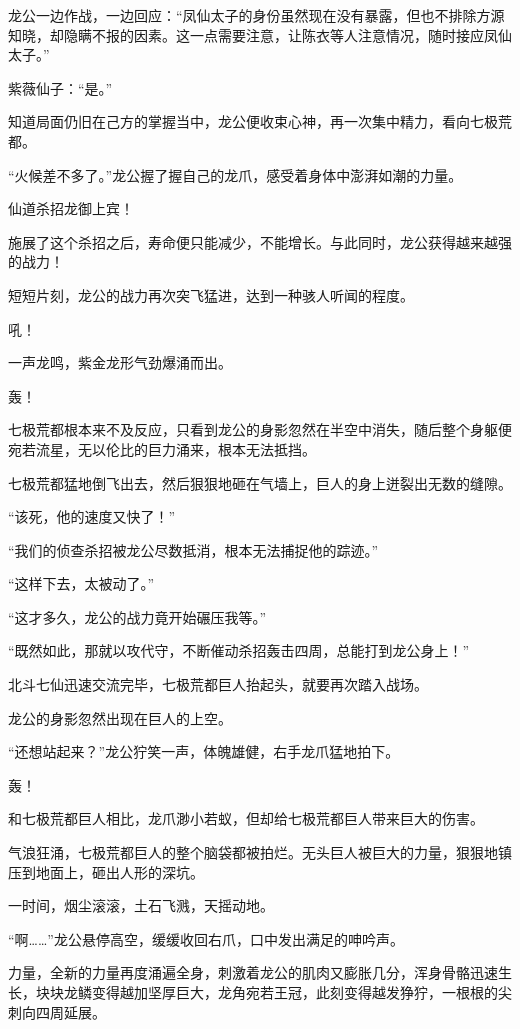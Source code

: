 \begin{this_body}
龙公一边作战，一边回应：“凤仙太子的身份虽然现在没有暴露，但也不排除方源知晓，却隐瞒不报的因素。这一点需要注意，让陈衣等人注意情况，随时接应凤仙太子。”

紫薇仙子：“是。”

知道局面仍旧在己方的掌握当中，龙公便收束心神，再一次集中精力，看向七极荒都。

“火候差不多了。”龙公握了握自己的龙爪，感受着身体中澎湃如潮的力量。

仙道杀招龙御上宾！

施展了这个杀招之后，寿命便只能减少，不能增长。与此同时，龙公获得越来越强的战力！

短短片刻，龙公的战力再次突飞猛进，达到一种骇人听闻的程度。

吼！

一声龙鸣，紫金龙形气劲爆涌而出。

轰！

七极荒都根本来不及反应，只看到龙公的身影忽然在半空中消失，随后整个身躯便宛若流星，无以伦比的巨力涌来，根本无法抵挡。

七极荒都猛地倒飞出去，然后狠狠地砸在气墙上，巨人的身上迸裂出无数的缝隙。

“该死，他的速度又快了！”

“我们的侦查杀招被龙公尽数抵消，根本无法捕捉他的踪迹。”

“这样下去，太被动了。”

“这才多久，龙公的战力竟开始碾压我等。”

“既然如此，那就以攻代守，不断催动杀招轰击四周，总能打到龙公身上！”

北斗七仙迅速交流完毕，七极荒都巨人抬起头，就要再次踏入战场。

龙公的身影忽然出现在巨人的上空。

“还想站起来？”龙公狞笑一声，体魄雄健，右手龙爪猛地拍下。

轰！

和七极荒都巨人相比，龙爪渺小若蚁，但却给七极荒都巨人带来巨大的伤害。

气浪狂涌，七极荒都巨人的整个脑袋都被拍烂。无头巨人被巨大的力量，狠狠地镇压到地面上，砸出人形的深坑。

一时间，烟尘滚滚，土石飞溅，天摇动地。

“啊……”龙公悬停高空，缓缓收回右爪，口中发出满足的呻吟声。

力量，全新的力量再度涌遍全身，刺激着龙公的肌肉又膨胀几分，浑身骨骼迅速生长，块块龙鳞变得越加坚厚巨大，龙角宛若王冠，此刻变得越发狰狞，一根根的尖刺向四周延展。


\end{this_body}
